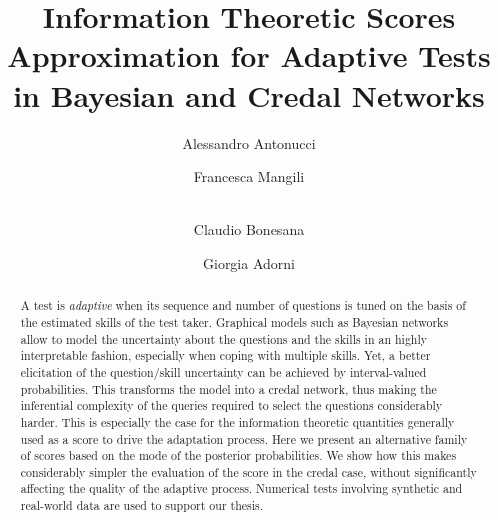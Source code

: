\documentclass[runningheads]{llncs}
\begin{document}
\title{Information Theoretic Scores Approximation for Adaptive Tests in Bayesian and Credal Networks}
\author{Alessandro Antonucci \and
Francesca Mangili \and\\
Claudio Bonesana \and
Giorgia Adorni}
\maketitle
\begin{abstract}
A test is \emph{adaptive} when its sequence and number of questions is tuned on the basis of the estimated skills of the test taker. Graphical models such as Bayesian networks allow to model the uncertainty about the questions and the skills in an highly interpretable fashion, especially when coping with multiple skills. Yet, a better elicitation of the question/skill uncertainty can be achieved by interval-valued probabilities. This transforms the model into a credal network, thus making the inferential complexity of the queries required to select the questions considerably harder. This is especially the case for the information theoretic quantities generally used as a score to drive the adaptation process. Here we present an alternative family of scores based on the mode of the posterior probabilities. We show how this makes considerably simpler the evaluation of the score in the credal case, without significantly affecting the quality of the adaptive process. Numerical tests involving synthetic and real-world data are used to support our thesis.
\end{abstract}
\end{document}
